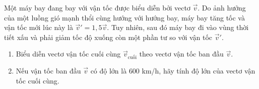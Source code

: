 \begin{ex}%
	Một máy bay đang bay với vận tốc được biểu diễn bởi vectơ $\overrightarrow{v}$. Do ảnh hưởng của một luồng gió mạnh thổi cùng hướng với hướng bay, máy bay tăng tốc và vận tốc mới lúc này là $\overrightarrow{v}' = 1{,}5\overrightarrow{v}$. Tuy nhiên, sau đó máy bay đi vào vùng thời tiết xấu và phải giảm tốc độ xuống còn một phần tư so với vận tốc $\overrightarrow{v}'$.
	\begin{enumerate}
		\item Biểu diễn vectơ vận tốc cuối cùng $\overrightarrow{v}_{\text{cuối}}$ theo vectơ vận tốc ban đầu $\overrightarrow{v}$.
		\item Nếu vận tốc ban đầu $\overrightarrow{v}$ có độ lớn là $600$ km/h, hãy tính độ lớn của vectơ vận tốc cuối cùng.
	\end{enumerate}
\end{ex}

